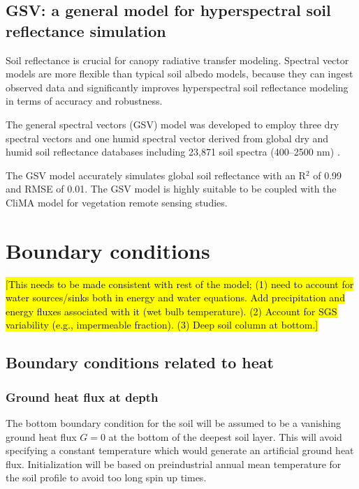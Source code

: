 \documentclass[twoside,10pt]{report}
\begin{document}
\subsection{GSV: a general model for hyperspectral soil reflectance simulation}

Soil reflectance is crucial for canopy radiative transfer modeling. Spectral vector models are more flexible than typical soil albedo models, because they can ingest observed data and significantly improves hyperspectral soil reflectance modeling in terms of accuracy and robustness.

The general spectral vectors (GSV) model was developed to employ three dry spectral vectors and one humid spectral vector derived from global dry and humid soil reflectance databases including 23,871 soil spectra (400–2500 nm) \citep{Jiang2019}. 

The GSV model accurately simulates global soil reflectance with an R$^{2}$ of 0.99 and RMSE of 0.01. The GSV model is highly suitable to be coupled with the CliMA model for vegetation remote sensing studies.



\section{Boundary conditions}\label{s:soil_boundary_conditions}

\hl{[This needs to be made consistent with rest of the model; (1) need to account for water sources/sinks both in energy and water equations. Add precipitation and energy fluxes associated with it (wet bulb temperature). (2) Account for SGS variability (e.g., impermeable fraction). (3) Deep soil column at bottom.]}
\subsection{Boundary conditions related to heat}
\subsubsection{Ground heat flux at depth}
The bottom boundary condition for the soil will be assumed to be a vanishing ground heat flux $G=0$ at the bottom of the deepest soil layer. This will avoid specifying a constant temperature which would generate an artificial ground heat flux. Initialization will be based on preindustrial annual mean temperature for the soil profile to avoid too long spin up times.
\end{document}

